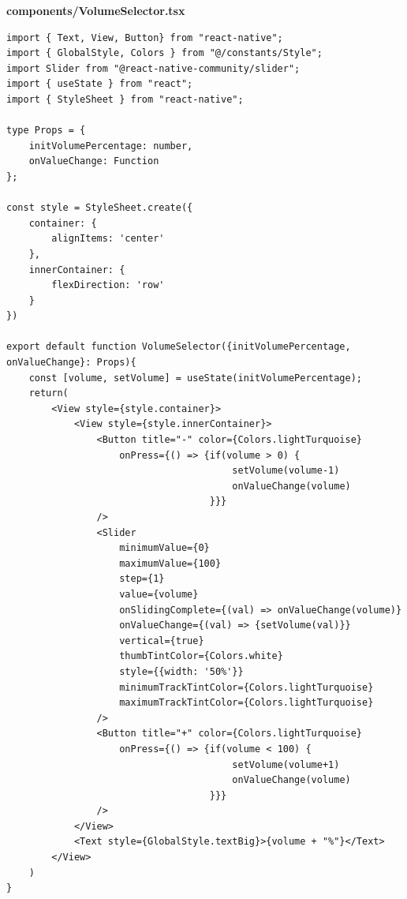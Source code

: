 \documentclass[11pt, twoside]{article}
\begin{document}
\textbf{components/VolumeSelector.tsx}
\begin{lstlisting}
import { Text, View, Button} from "react-native";
import { GlobalStyle, Colors } from "@/constants/Style";
import Slider from "@react-native-community/slider";
import { useState } from "react";
import { StyleSheet } from "react-native";

type Props = {
    initVolumePercentage: number,
    onValueChange: Function
};

const style = StyleSheet.create({
    container: {
        alignItems: 'center'
    },
    innerContainer: {
        flexDirection: 'row'
    }
})

export default function VolumeSelector({initVolumePercentage, onValueChange}: Props){
    const [volume, setVolume] = useState(initVolumePercentage);
    return(
        <View style={style.container}>
            <View style={style.innerContainer}>
                <Button title="-" color={Colors.lightTurquoise}
                    onPress={() => {if(volume > 0) {
                                        setVolume(volume-1)
                                        onValueChange(volume)
                                    }}}
                />
                <Slider
                    minimumValue={0}
                    maximumValue={100}
                    step={1}
                    value={volume}
                    onSlidingComplete={(val) => onValueChange(volume)}
                    onValueChange={(val) => {setVolume(val)}}
                    vertical={true}
                    thumbTintColor={Colors.white}
                    style={{width: '50%'}}
                    minimumTrackTintColor={Colors.lightTurquoise}
                    maximumTrackTintColor={Colors.lightTurquoise}
                />
                <Button title="+" color={Colors.lightTurquoise}
                    onPress={() => {if(volume < 100) {
                                        setVolume(volume+1)
                                        onValueChange(volume)
                                    }}}
                />
            </View>
            <Text style={GlobalStyle.textBig}>{volume + "%"}</Text>
        </View>
    )
}
\end{lstlisting}
\end{document}
